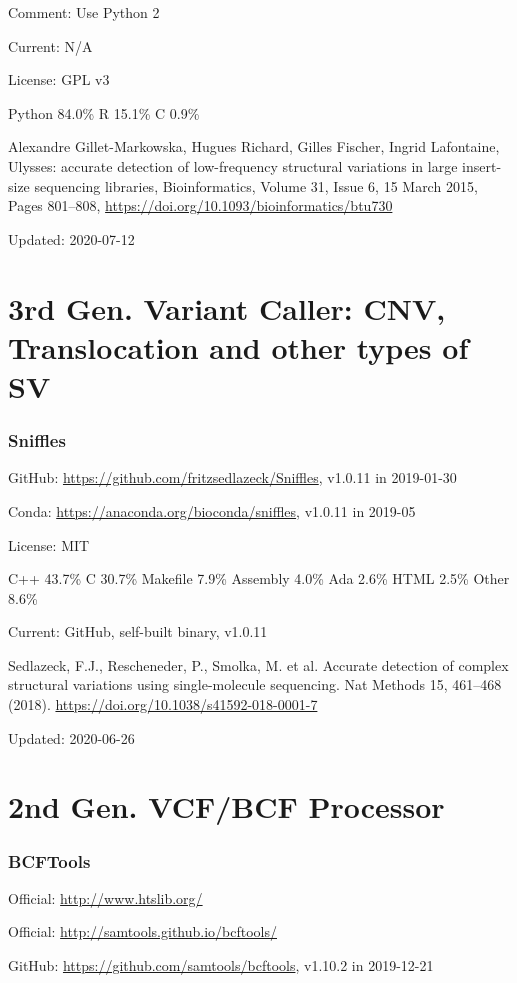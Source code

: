 \documentclass[]{article}
\begin{document}
Comment: Use Python 2

Current: N/A

License: GPL v3

Python 84.0\% R 15.1\% C 0.9\%

Alexandre Gillet-Markowska, Hugues Richard, Gilles Fischer, Ingrid Lafontaine, Ulysses: accurate detection of low-frequency structural variations in large insert-size sequencing libraries, Bioinformatics, Volume 31, Issue 6, 15 March 2015, Pages 801–808, \url{https://doi.org/10.1093/bioinformatics/btu730}

Updated: 2020-07-12

\part{3rd Gen. Variant Caller: CNV, Translocation and other types of SV}

\section{Sniffles}

GitHub: \url{https://github.com/fritzsedlazeck/Sniffles}, v1.0.11 in 2019-01-30

Conda: \url{https://anaconda.org/bioconda/sniffles}, v1.0.11 in 2019-05

License: MIT

C++ 43.7\% C 30.7\% Makefile 7.9\% Assembly 4.0\% Ada 2.6\% HTML 2.5\% Other 8.6\%

Current: GitHub, self-built binary, v1.0.11

Sedlazeck, F.J., Rescheneder, P., Smolka, M. et al. Accurate detection of complex structural variations using single-molecule sequencing. Nat Methods 15, 461–468 (2018). \url{https://doi.org/10.1038/s41592-018-0001-7}

Updated: 2020-06-26

\part{2nd Gen. VCF/BCF Processor}

\section{BCFTools}

Official: \url{http://www.htslib.org/}

Official: \url{http://samtools.github.io/bcftools/}

GitHub: \url{https://github.com/samtools/bcftools}, v1.10.2 in 2019-12-21
\end{document}
